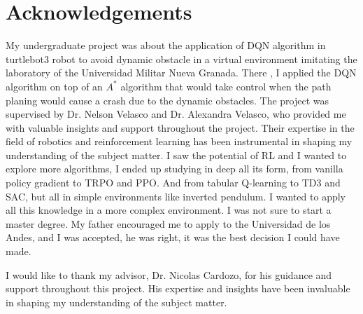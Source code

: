 
\chapter{Acknowledgements}
My undergraduate project was about the application of DQN algorithm in turtlebot3 robot to avoid dynamic obstacle in a virtual environment imitating the laboratory of the Universidad Militar Nueva Granada. There , I applied the DQN algorithm on top of an $A^*$ algorithm that would take control when the path planing would cause a crash due to the dynamic obstacles. The project was supervised by Dr. Nelson Velasco and Dr. Alexandra Velasco, who provided me with valuable insights and support throughout the project. Their expertise in the field of robotics and reinforcement learning has been instrumental in shaping my understanding of the subject matter. I saw the potential of RL and I wanted to explore more algorithms, I ended up studying in deep all its form, from vanilla policy gradient to TRPO and PPO. And from tabular Q-learning to TD3 and SAC, but all in simple environments like inverted pendulum. I wanted to apply all this knowledge in a more complex environment. I was not sure to start a master degree.
My father encouraged me to apply to the Universidad de los Andes, and I was accepted, he was right, it was the best decision I could have made.

I would like to thank my advisor, Dr. Nicolas Cardozo, for his guidance and support throughout this project. His expertise and insights have been invaluable in shaping my understanding of the subject matter.
\endinput

